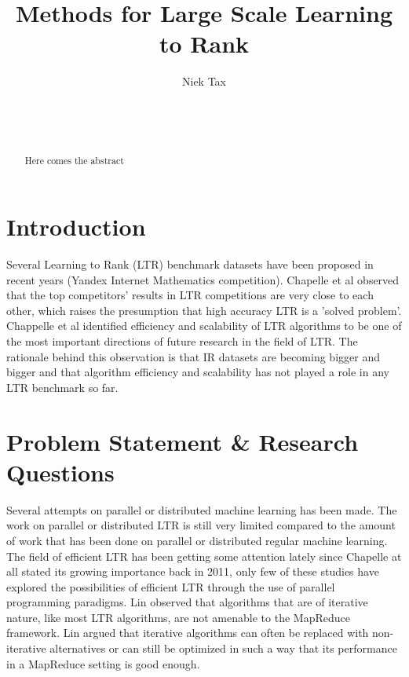 \documentclass{sig-alternate-br}
\begin{document}

\title{Methods for Large Scale Learning to Rank}

\author{
\alignauthor Niek Tax\\
       \\
       \\
       \\
}

\maketitle
\begin{abstract}
Here comes the abstract
\end{abstract} 


\section{Introduction}
Several Learning to Rank (LTR) benchmark datasets have been proposed in recent years \cite{Chapelle2011a,Qin2010,Alcantara2010} (Yandex Internet Mathematics competition). Chapelle et al \cite{Chapelle2011b} observed that the top competitors' results in LTR competitions are very close to each other, which raises the presumption that high accuracy LTR is a 'solved problem'.\\

Chappelle et al \cite{Chapelle2011b} identified efficiency and scalability of LTR algorithms to be one of the most important directions of future research in the field of LTR. The rationale behind this observation is that IR datasets are becoming bigger and bigger and that algorithm efficiency and scalability has not played a role in any LTR benchmark so far.
\section{Problem Statement \& Research Questions}
Several attempts on parallel or distributed machine learning \cite{Chu2007,Chang2007} has been made. The work on parallel or distributed LTR is still very limited compared to the amount of work that has been done on parallel or distributed regular machine learning. The field of efficient LTR has been getting some attention lately \cite{Asadi2013a,Asadi2013b,Busa-Fekete2012,Sousa2012,Shukla2012} since Chapelle at all \cite{Chapelle2011b} stated its growing importance back in 2011, only few of these studies \cite{Sousa2012,Shukla2012} have explored the possibilities of efficient LTR through the use of parallel programming paradigms. Lin \cite{Lin2013} observed that algorithms that are of iterative nature, like most LTR algorithms, are not amenable to the MapReduce framework. Lin \cite{Lin2013} argued that iterative algorithms can often be replaced with non-iterative alternatives or can still be optimized in such a way that its performance in a MapReduce setting is good enough.\\
\end{document}

